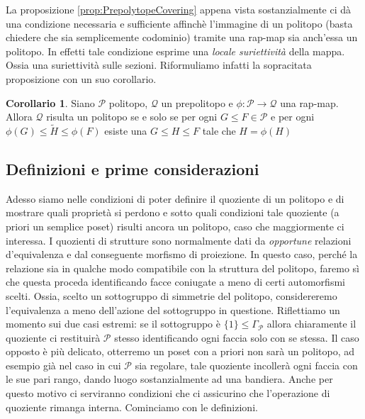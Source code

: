 \documentclass[a4paper,12pt]{report}
\newcommand{\p}{\mathcal{P}}
\theoremstyle{plain}
\theoremstyle{definition}
\newtheorem{corol}[teo]{Corollario}
\begin{document}
La proposizione \ref{prop:PrepolytopeCovering} appena vista sostanzialmente ci d\`a una condizione necessaria e sufficiente affinch\`e l'immagine di
un politopo (basta chiedere che sia semplicemente codominio) tramite una rap-map sia anch'essa un politopo. In effetti tale condizione esprime
una \emph{locale suriettivit\`a} della mappa. Ossia una suriettivit\`a sulle sezioni. Riformuliamo infatti la sopracitata proposizione con un suo
corollario.
\begin{corol}
\label{corol:PrepolytopeCovering}
Siano $\p$ politopo, $\mathcal{Q}$ un prepolitopo e $\phi:\p\longrightarrow\mathcal{Q}$ una rap-map. Allora $\mathcal{Q}$ risulta un politopo
se e solo se per ogni $G\leq F\in\p$ e per ogni $\phi(G)\leq\tilde{H}\leq\phi(F)$ esiste una $G\leq H\leq F$ tale che ${H}=\phi(H)$
\end{corol}

\subsection{Definizioni e prime considerazioni}
Adesso siamo nelle condizioni di poter definire il quoziente di un politopo e di mostrare quali propriet\`a si perdono e sotto quali condizioni
tale quoziente (a priori un semplice poset) risulti ancora un politopo, caso che maggiormente ci interessa. I quozienti di strutture sono normalmente
dati da \emph{opportune} relazioni d'equivalenza e dal conseguente morfismo di proiezione. In questo caso, perché la relazione sia in qualche
modo compatibile con la struttura del politopo, faremo s\`i che questa proceda identificando facce coniugate a meno di certi automorfismi scelti.
Ossia, scelto un sottogruppo di simmetrie del politopo, considereremo l'equivalenza a meno dell'azione del sottogruppo in questione.
Riflettiamo un momento sui due casi estremi: se il sottogruppo \`e $\{1\}\leq\Gamma_\p$ allora chiaramente il quoziente ci restituir\`a $\p$ stesso
identificando ogni faccia solo con se stessa. Il caso opposto \`e pi\`u delicato, otterremo un poset con a priori non sar\`a un politopo, ad esempio
gi\`a nel caso in cui $\p$ sia regolare, tale quoziente incoller\`a ogni faccia con le sue pari rango, dando luogo sostanzialmente ad una bandiera.
Anche per questo motivo ci serviranno condizioni che ci assicurino che l'operazione di quoziente rimanga interna. Cominciamo con le definizioni.
\end{document}
